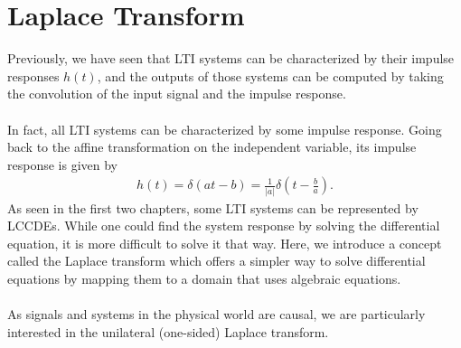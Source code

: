 \documentclass{report}
\begin{document}
\setcounter{chapter}{3}
\chapter{Laplace Transform}
Previously, we have seen that LTI systems can be characterized by their impulse responses $h(t)$, and the outputs of those systems can be computed 
by taking the convolution of the input signal and the impulse response. 
\\ \\ 
In fact, all LTI systems can be characterized by some impulse response. Going back 
to the affine transformation on the independent variable, its impulse response is given by 
\begin{align}
    h(t)=\delta(at-b)=\frac{1}{|a|}\delta\left(t-\frac{b}{a}\right).
\end{align}
As seen in the first two chapters, some LTI systems can be represented by LCCDEs. While one could find the system response by solving the differential equation, 
it is more difficult to solve it that way. Here, we introduce a concept called the Laplace transform which offers a simpler way to solve differential equations 
by mapping them to a domain that uses algebraic equations.
\\ \\
As signals and systems in the physical world are causal, we are particularly interested in the unilateral (one-sided) Laplace transform. 
\end{document}
